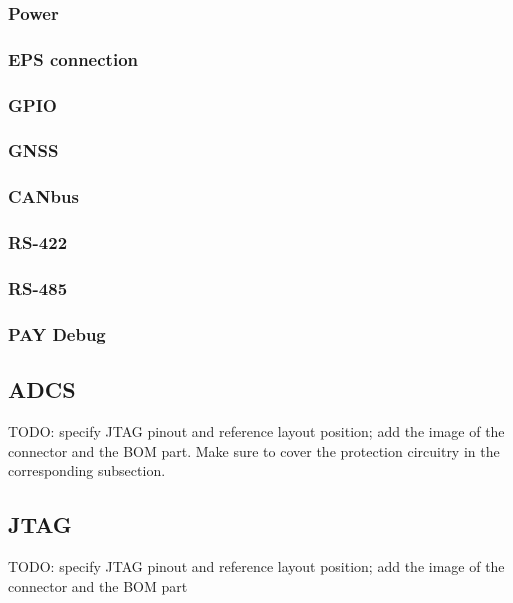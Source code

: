 \documentclass[10pt]{../datasheet}
\begin{document}
\subsubsection{Power}

\subsubsection{EPS connection}

\subsubsection{GPIO}

\subsubsection{GNSS}

\subsubsection{CANbus}

\subsubsection{RS-422}

\subsubsection{RS-485}

\subsubsection{PAY Debug}

\subsection{ADCS}

TODO: specify JTAG pinout and reference layout position; add the image of the
connector and the BOM part. Make sure to cover the protection circuitry in the
corresponding subsection.

\subsection{JTAG}

TODO: specify JTAG pinout and reference layout position; add the image of the
connector and the BOM part
\end{document}
